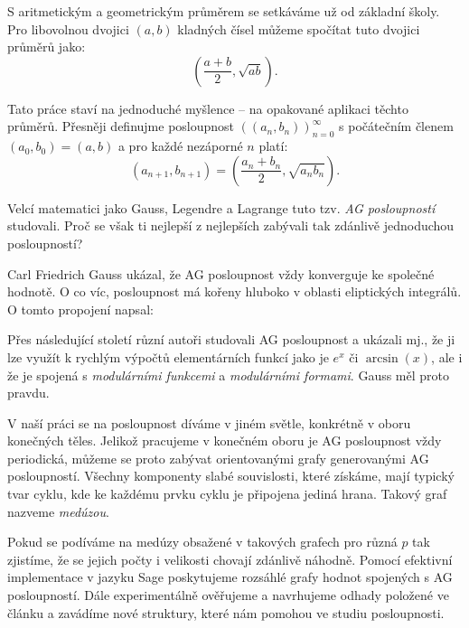 \documentclass[12pt]{report}
\begin{document}
S aritmetickým a geometrickým průměrem se setkáváme už od základní školy. Pro libovolnou dvojici $(a,b)$ kladných čísel můžeme spočítat tuto dvojici průměrů jako:
$$\left(\frac{a+b}{2}, \sqrt{ab} \right).$$

Tato práce staví na jednoduché myšlence -- na opakované aplikaci těchto průměrů. Přesněji definujme posloupnost $((a_n,b_n))_{n=0}^{\infty}$ s počátečním členem $(a_0,b_0) = (a,b)$ a pro každé nezáporné $n$ platí:
$$\left(a_{n+1},b_{n+1} \right) = \left( \frac{a_n+b_n}{2}, \sqrt{a_n b_n} \right).$$

Velcí matematici jako Gauss, Legendre a Lagrange tuto tzv. \textit{AG posloupností} studovali. Proč se však ti nejlepší z nejlepších zabývali tak zdánlivě jednoduchou posloupností?

Carl Friedrich Gauss ukázal, že AG posloupnost vždy konverguje ke společné hodnotě. O co víc, posloupnost má kořeny hluboko v oblasti eliptických integrálů. O tomto propojení napsal:
\begin{center}
\begin{verse}
\textit{}
\end{verse}
\end{center}
Přes následující století různí autoři studovali AG posloupnost a ukázali mj., že ji lze využít k rychlým výpočtů elementárních funkcí jako je $e^x$ či $\arcsin(x)$, ale i že je spojená s \textit{modulárními funkcemi} a \textit{modulárními formami}. Gauss měl proto pravdu.

V naší práci se na posloupnost díváme v jiném světle, konkrétně v oboru konečných těles. Jelikož pracujeme v konečném oboru je AG posloupnost vždy periodická, můžeme se proto zabývat orientovanými grafy generovanými AG posloupností. Všechny komponenty slabé souvislosti, které získáme, mají typický tvar cyklu, kde ke každému prvku cyklu je připojena jediná hrana. Takový graf nazveme \textit{medúzou}.

Pokud se podíváme na medúzy obsažené v takových grafech pro různá $p$ tak zjistíme, že se jejich počty i velikosti chovají zdánlivě náhodně. Pomocí efektivní implementace v jazyku Sage poskytujeme rozsáhlé grafy hodnot spojených s AG posloupností. Dále experimentálně ověřujeme a navrhujeme odhady položené ve článku \cite{Meduza} a zavádíme nové struktury, které nám pomohou ve studiu posloupnosti.

\end{document}
